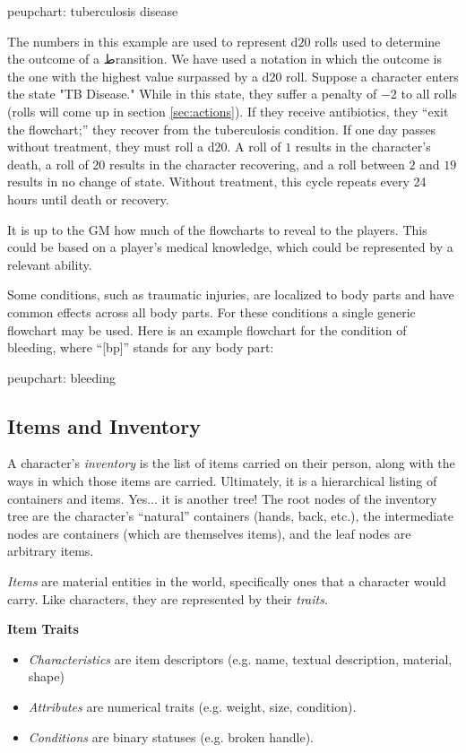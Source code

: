 \documentclass[12pt]{article}
\newcommand{\notes}[1]{{\color{Tan} #1}}
\newcommand{\emdex}[1]{\emph{#1}\index{#1}}
\begin{document}
\notes{peupchart: tuberculosis disease}

The numbers in this example are used to represent d$20$ rolls used to determine the outcome of a طransition. 
We have used a notation in which the outcome is the one with the highest value surpassed by a d$20$ roll.
Suppose a character enters the state "TB Disease."
While in this state, they suffer a penalty of $-2$ to all rolls (rolls will come up in section \ref{sec:actions}).
If they receive antibiotics, they ``exit the flowchart;'' they recover from the tuberculosis condition.
If one day passes without treatment, they must roll a d$20$.
A roll of $1$ results in the character's death, a roll of $20$ results in the character recovering,
and a roll between $2$ and $19$ results in no change of state.
Without treatment, this cycle repeats every 24 hours until death or recovery.

It is up to the GM how much of the flowcharts to reveal to the players.
This could be based on a player's medical knowledge, which could be represented by a relevant ability.

Some conditions, such as traumatic injuries, are localized to body parts and have common effects across all body parts.
For these conditions a single generic flowchart may be used. Here is an example flowchart for the condition of bleeding,
where ``[bp]'' stands for any body part:

\notes{peupchart: bleeding}


\subsection{Items and Inventory} \label{sec:items}
A character's \emdex{inventory} is the list of items carried on their person,
along with the ways in which those items are carried.
Ultimately, it is a hierarchical listing of containers and items.
Yes... it is another tree!
The root nodes of the inventory tree are the character's ``natural'' containers (hands, back, etc.),
the intermediate nodes are containers (which are themselves items),
and the leaf nodes are arbitrary items.

\emph{Items} are material entities in the world, 
specifically ones that a character would carry.
Like characters, they are represented by their \emph{traits}.

\textbf{Item Traits}
\vspace{-1em}
\begin{itemize}
\item \emph{Characteristics} are item descriptors (e.g. name, textual description, material, shape)
\item \emph{Attributes} are numerical traits (e.g. weight, size, condition).
\item \emph{Conditions} are binary statuses (e.g. broken handle).
\end{itemize}
\end{document}
